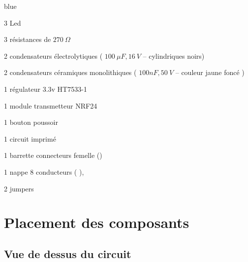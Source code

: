 \begin{items}{blue}{\Triangle}
    \item 3 Led
    \item 3 résistances de $270~\Omega$
    \item 2 condensateurs électrolytiques ( $100~\mu F, 16~V$ – cylindriques noirs)
    \item 2 condensateurs céramiques monolithiques ( $100nF, 50~V$ – couleur jaune foncé )
    \item 1 régulateur 3.3v HT7533-1
    \item 1 module transmetteur NRF24
    \item 1 bouton poussoir
    \item 1 circuit imprimé
    \item 1 barrette connecteurs femelle ()
    \item 1 nappe 8 conducteurs ( ),
    \item 2 jumpers
\end{items}

\section{Placement des composants}

\subsection{Vue de dessus du circuit}
\label{TEST}
